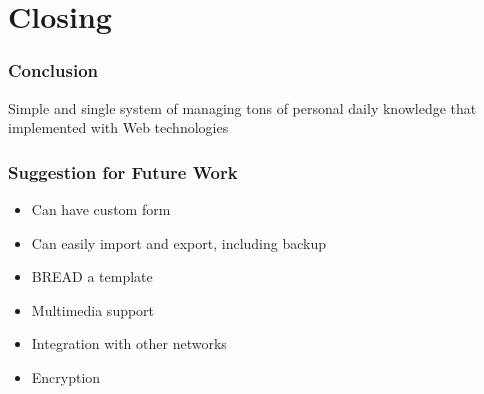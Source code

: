 \documentclass[10pt, compress]{beamer}
\begin{document}

\section{Closing}


\begin{frame}[fragile]
  \frametitle{Conclusion}

  Simple and \alert{single system} of managing tons of \alert{personal daily knowledge}
  that implemented with \alert{Web technologies}

\end{frame}


\begin{frame}[fragile]
  \frametitle{Suggestion for Future Work}

  \begin{itemize} \itemsep0pt
    \item Can have custom form
    \item Can easily import and export, including backup
    \item \textsc{BREAD} a template
    \item Multimedia support
    \item Integration with other networks
    \item Encryption
  \end{itemize}

\end{frame}



\end{document}
